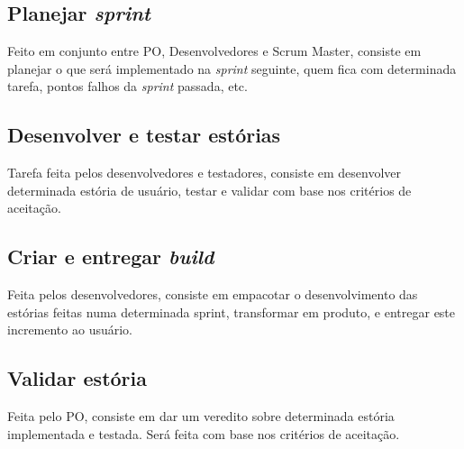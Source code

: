 \subsection{Planejar \emph{sprint}}
Feito em conjunto entre PO, Desenvolvedores e Scrum Master, consiste em planejar o que será implementado na \emph{sprint} seguinte, quem fica com determinada tarefa, pontos falhos da \emph{sprint} passada, etc.

\subsection{Desenvolver e testar estórias}
Tarefa feita pelos desenvolvedores e testadores, consiste em desenvolver determinada estória de usuário, testar e validar com base nos critérios de aceitação.

\subsection{Criar e entregar \emph{build}}
Feita pelos desenvolvedores, consiste em empacotar o desenvolvimento das estórias feitas numa determinada sprint, transformar em produto, e entregar este incremento ao usuário.

\subsection{Validar estória}
Feita pelo PO, consiste em dar um veredito sobre determinada estória implementada e testada. Será feita com base nos critérios de aceitação.
